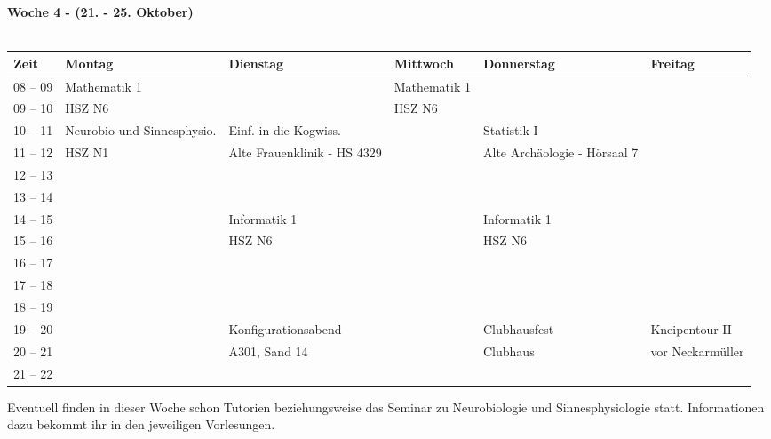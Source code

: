 \vfil
\textbf{Woche 4 - (21. - 25. Oktober)}\\
\\
\begin{tabular}{|l|p{}|p{}|p{}|p{}|p{}|} \hline
 Zeit & Montag & Dienstag & Mittwoch & Donnerstag & Freitag \\ \hline \hline
 08 -- 09 & \footnotesize{Mathematik 1} & & \footnotesize{Mathematik 1} & & \\ \cline{1-1}
 09 -- 10 & \scriptsize{HSZ N6} & & \scriptsize{HSZ N6} & & \\ \hline
 10 -- 11 & \footnotesize{Neurobio und Sinnesphysio.} & \footnotesize{Einf. in die Kogwiss.} & & \footnotesize{Statistik I} & \\ \cline{1-1} 
 11 -- 12 & \scriptsize{HSZ N1} & \scriptsize{Alte Frauenklinik - HS 4329} & & \scriptsize{Alte Archäologie - Hörsaal 7} & \\ \hline
 12 -- 13 & & & & & \\ \cline{1-1}
 13 -- 14 & & & & & \\ \hline
 14 -- 15 & & \footnotesize{Informatik 1} & & \footnotesize{Informatik 1} & \\ \cline{1-1}
 15 -- 16 & & \scriptsize{HSZ N6} & & \scriptsize{HSZ N6} & \\ \hline
 16 -- 17 & & & & & \\ \cline{1-1}
 17 -- 18 & & & & & \\ \hline
 18 -- 19 & & & & & \\ \cline{5-6} \cline{1-1} \cline{3-3} 
 19 -- 20 & & \footnotesize{Konfigurations\-abend}  \cellcolor{lightlightgray}& & \footnotesize{Clubhausfest}  \cellcolor{lightlightgray}& \footnotesize{Kneipentour II}  \cellcolor{lightlightgray}\\ \cline{1-2} \cline{4-4}
 20 -- 21 & &\scriptsize{A301, Sand 14}   \cellcolor{lightlightgray}& & \scriptsize{Clubhaus}  \cellcolor{lightlightgray}& \cellcolor{lightlightgray} \scriptsize{vor Neckarmüller} \\ \cline{1-1}
 21 -- 22 & & \cellcolor{lightlightgray} & &  \cellcolor{lightlightgray}& \cellcolor{lightlightgray} \\ \hline
\end{tabular}


\footnotesize{Eventuell finden in dieser Woche schon Tutorien beziehungsweise das Seminar zu Neurobiologie und Sinnesphysiologie statt. Informationen dazu bekommt ihr in den jeweiligen Vorlesungen.}
\normalsize
\newpage
